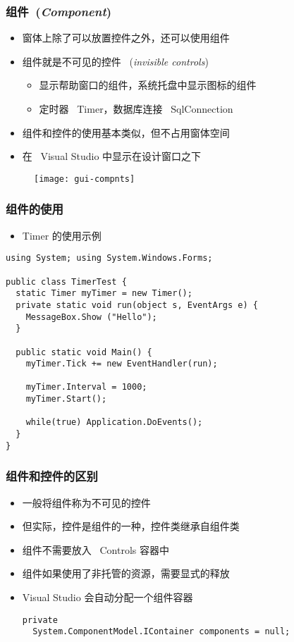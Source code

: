 \begin{frame}
\frametitle{组件~(\textit{Component})}
\begin{itemize}
\item 窗体上除了可以放置控件之外，还可以使用组件
\item 组件就是不可见的控件 ~(\textit{invisible controls})
\begin{itemize}
\item 显示帮助窗口的组件，系统托盘中显示图标的组件
\item 定时器 ~Timer，数据库连接 ~SqlConnection
\end{itemize}
\item 组件和控件的使用基本类似，但不占用窗体空间
\item 在 ~Visual Studio 中显示在设计窗口之下
\end{itemize}
\begin{figure}[htbp]
  \centering
  \texttt{[image: gui-compnts]}
\end{figure}
\end{frame}

\begin{frame}[fragile]
\frametitle{组件的使用}
\begin{itemize}
\item Timer 的使用示例
\end{itemize}
\begin{lstlisting}
using System; using System.Windows.Forms;

public class TimerTest {
  static Timer myTimer = new Timer();
  private static void run(object s, EventArgs e) {
    MessageBox.Show ("Hello");
  }
 
  public static void Main() {
    myTimer.Tick += new EventHandler(run);
 
    myTimer.Interval = 1000;
    myTimer.Start();
 
    while(true) Application.DoEvents();
  }
}
\end{lstlisting}
\end{frame}

\begin{frame}[fragile]
\frametitle{组件和控件的区别}
\begin{itemize}
\setlength{\itemsep}{6pt plus 1pt}
\item 一般将组件称为不可见的控件
\item 但实际，控件是组件的一种，控件类继承自组件类
\item 组件不需要放入 ~Controls 容器中
\item 组件如果使用了非托管的资源，需要显式的释放
\item Visual Studio 会自动分配一个组件容器
\begin{lstlisting}
private
  System.ComponentModel.IContainer components = null;
\end{lstlisting}
\end{itemize}
\end{frame}

